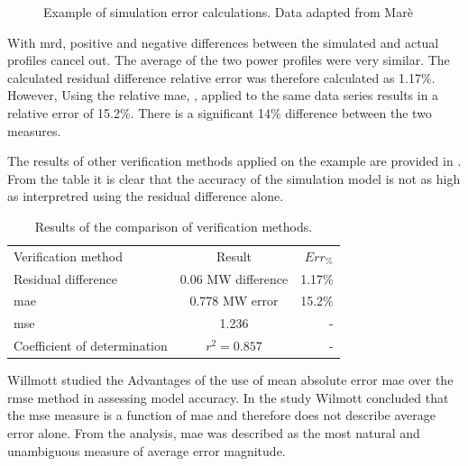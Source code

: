  		
 	\begin{figure}[!htbp]
 		\centering
 		
 		\caption[Example of simulation error calculations]{Example of simulation error calculations. Data adapted from Marè \cite{Mare2016PhD}}
 		\label{fig:Philipp Difference verify}
 	\end{figure}
 With \gls{mrd}, positive and negative differences between the simulated and actual profiles cancel out. The average of the two power profiles were very similar. The calculated residual difference relative error was therefore calculated as 1.17\%. However, Using the relative \gls{mae}, , applied to the same data series results in a relative error of 15.2\%. There is a significant 14\% difference between the two measures. 
 \par
 The results of other verification methods applied on the example are provided in . From the table it is clear that the accuracy of the simulation model is not as high as interpretred using the residual difference alone.
 \begin{table}[!htbp]
 	\centering
 	\begin{tabular}{lcr}
 		\hline
 		Verification method & Result & $Err_{\%}$\\
 		\hhline{===}
 		Residual difference     & 0.06 MW difference & 1.17\% \\
 		\gls{mae} 					 & 0.778 MW error & 15.2\% \\
 		\gls{mse} 				   & 1.236  & -\\
 		Coefficient of determination & $r^2 =0.857$  & -\\
 		\hline
 	\end{tabular} 
 \caption{Results of the comparison of verification methods.}
 \label{Philip verification table}
 \end{table}
 
 	\par 
 	Willmott \cite{willmott2005advantages} studied the Advantages of the use of mean absolute error \gls{mae} over the \gls{rmse} method in assessing model accuracy. In the study Wilmott concluded that the \gls{mse} measure is a function of \gls{mae} and therefore does not describe average error alone. From the analysis, \gls{mae} was described as the most natural and unambiguous measure of average error magnitude.

